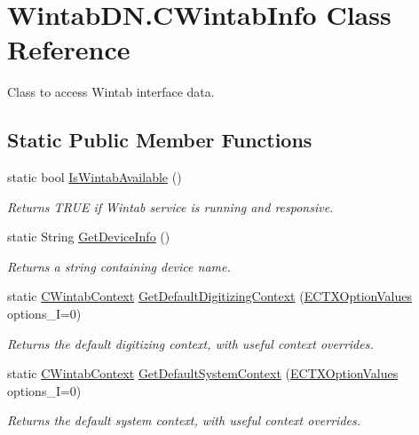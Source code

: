 \hypertarget{class_wintab_d_n_1_1_c_wintab_info}{}\section{Wintab\+D\+N.\+C\+Wintab\+Info Class Reference}
\label{class_wintab_d_n_1_1_c_wintab_info}


Class to access Wintab interface data.  


\subsection*{Static Public Member Functions}
\begin{DoxyCompactItemize}
\item 
static bool \mbox{\hyperlink{class_wintab_d_n_1_1_c_wintab_info_ade0433e0979734111164bcb759bcc229}{Is\+Wintab\+Available}} ()
\begin{DoxyCompactList}\small\item\em Returns T\+R\+UE if Wintab service is running and responsive. \end{DoxyCompactList}\item 
static String \mbox{\hyperlink{class_wintab_d_n_1_1_c_wintab_info_a8f2991e434881527d077c2278771919b}{Get\+Device\+Info}} ()
\begin{DoxyCompactList}\small\item\em Returns a string containing device name. \end{DoxyCompactList}\item 
static \mbox{\hyperlink{class_wintab_d_n_1_1_c_wintab_context}{C\+Wintab\+Context}} \mbox{\hyperlink{class_wintab_d_n_1_1_c_wintab_info_a7bceb028e21a4c94d44ba0e3b8a75fa4}{Get\+Default\+Digitizing\+Context}} (\mbox{\hyperlink{namespace_wintab_d_n_a701e8021b6889039ed562596a2d1bdd2}{E\+C\+T\+X\+Option\+Values}} options\+\_\+I=0)
\begin{DoxyCompactList}\small\item\em Returns the default digitizing context, with useful context overrides. \end{DoxyCompactList}\item 
static \mbox{\hyperlink{class_wintab_d_n_1_1_c_wintab_context}{C\+Wintab\+Context}} \mbox{\hyperlink{class_wintab_d_n_1_1_c_wintab_info_ad514f07b446a92bc1f1fc8154cf66d45}{Get\+Default\+System\+Context}} (\mbox{\hyperlink{namespace_wintab_d_n_a701e8021b6889039ed562596a2d1bdd2}{E\+C\+T\+X\+Option\+Values}} options\+\_\+I=0)
\begin{DoxyCompactList}\small\item\em Returns the default system context, with useful context overrides. \end{DoxyCompactList}\item 

\end{DoxyCompactItemize}

